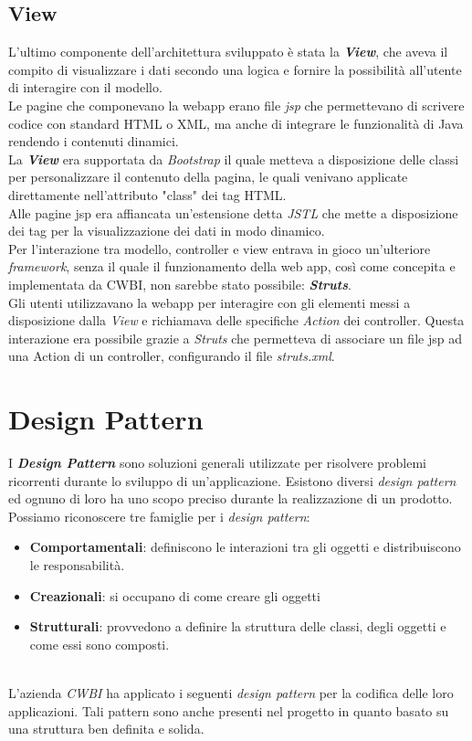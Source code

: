 \subsection*{View}
L'ultimo componente dell'architettura sviluppato è stata la \textit{\textbf{View}}, che aveva il compito di visualizzare i dati secondo una logica e fornire la possibilità all'utente di interagire con il modello.
\\
\noindent
Le pagine che componevano la webapp erano file \textit{jsp} che permettevano di scrivere codice con standard HTML o XML, ma anche di integrare le funzionalità di Java rendendo i contenuti dinamici. \\
\newpage
\noindent
La \textbf{\textit{View}} era supportata da \textit{Bootstrap} il quale metteva a disposizione delle classi per personalizzare il contenuto della pagina, le quali venivano applicate direttamente nell'attributo "class" dei tag HTML.\\
Alle pagine jsp era affiancata un'estensione detta \textit{JSTL} che mette a disposizione dei tag per la visualizzazione dei dati in modo dinamico.
\\
\noindent
Per l'interazione tra modello, controller e view entrava in gioco un'ulteriore \textit{framework}, senza il quale il funzionamento della web app, così come concepita e implementata da CWBI, non sarebbe stato possibile: \textit{\textbf{Struts}}.\\

\noindent
Gli utenti utilizzavano la webapp per interagire con gli elementi messi a disposizione dalla \textit{View} e richiamava delle specifiche \textit{Action} dei controller. Questa interazione era possibile grazie a \textit{Struts} che permetteva di associare un file jsp ad una Action di un controller, configurando il file \textit{struts.xml}.

\section{Design Pattern}
I \textbf{\textit{Design Pattern}} sono soluzioni generali utilizzate per risolvere problemi ricorrenti durante lo sviluppo di un'applicazione. Esistono diversi \textit{design pattern} ed ognuno di loro ha uno scopo preciso durante la realizzazione di un prodotto. \\
Possiamo riconoscere tre famiglie per i \textit{design pattern}:\\
\begin{itemize}
\item \textbf{Comportamentali}: definiscono le interazioni tra gli oggetti e distribuiscono le responsabilità.
\item \textbf{Creazionali}: si occupano di come creare gli oggetti
\item \textbf{Strutturali}: provvedono a definire la struttura delle classi, degli oggetti e come essi sono composti.
\end{itemize} 
\\
\noindent
L'azienda \textit{CWBI} ha applicato i seguenti \textit{design pattern} per la codifica delle loro applicazioni. Tali pattern sono anche presenti nel progetto in quanto basato su una struttura ben definita e solida.

